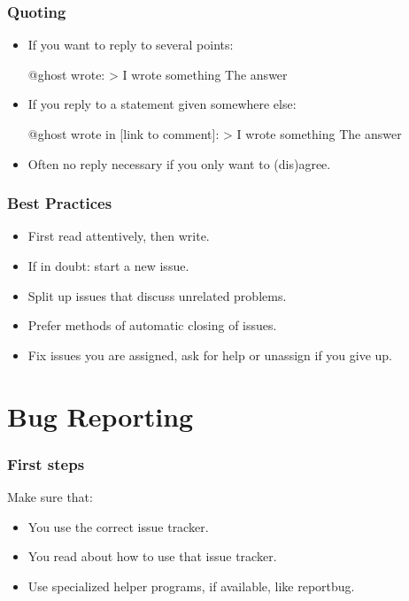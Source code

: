 \begin{frame}[fragile]
	\frametitle{Quoting}

	\begin{itemize}
	\item If you want to reply to several points:
		\begin{code}[gobble=8]
		@ghost wrote:
		> I wrote something
		The answer
		\end{code}
	\item If you reply to a statement given somewhere else:
		\begin{code}[gobble=8]
		@ghost wrote in [link to comment]:
		> I wrote something
		The answer
		\end{code}
	\item Often no reply necessary if you only want to (dis)agree.
	\end{itemize}
\end{frame}

\begin{frame}
	\frametitle{Best Practices}
	\begin{itemize}
		\item First read attentively, then write.
		\item If in doubt: start a new issue.
		\item Split up issues that discuss unrelated problems.
		\item Prefer methods of automatic closing of issues.
		\item Fix issues you are assigned, ask for help or unassign if you give up.
	\end{itemize}
\end{frame}

\section{Bug Reporting}


\begin{frame}
	\frametitle{First steps}
	Make sure that:
	\begin{itemize}
		\item You use the correct issue tracker.
		\item You read about how to use that issue tracker.
		\item Use specialized helper programs, if available, like reportbug.
	\end{itemize}
\end{frame}

